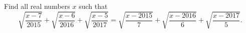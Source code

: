 Find all real numbers $x$ such that
\[
\sqrt{\dfrac{x-7}{2015}}+\sqrt{\dfrac{x-6}{2016}}+\sqrt{\dfrac{x-5}{2017}}=\sqrt{\dfrac{x-2015}{7}}+\sqrt{\dfrac{x-2016}{6}}+\sqrt{\dfrac{x-2017}{5}} .
\]
